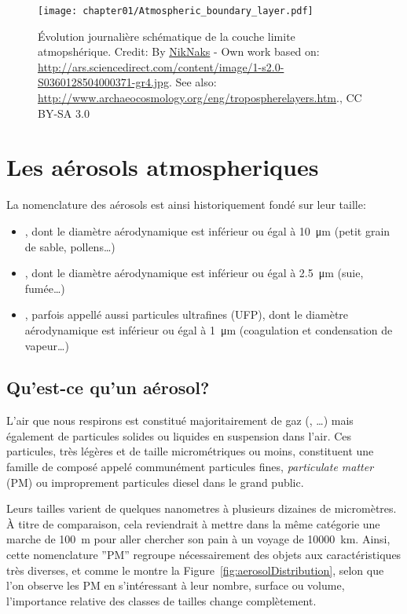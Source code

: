 \begin{figure}[h]
    \centering
    \texttt{[image: chapter01/Atmospheric\_boundary\_layer.pdf]}
    \caption{Évolution journalière schématique de la couche limite atmopshérique.
        Credit: By
        \href{https://commons.wikimedia.org/w/index.php?curid=18862904}{NikNaks} - Own
        work based on:
        \url{http://ars.sciencedirect.com/content/image/1-s2.0-S0360128504000371-gr4.jpg}.
        See also: \url{http://www.archaeocosmology.org/eng/tropospherelayers.htm}., CC
        BY-SA 3.0
    }%
    \label{fig:chapter01/Atmospheric_boundary_layer}
\end{figure}


\section{Les aérosols atmospheriques}%
\label{sec:les_aerosols_atmospheriques}
La nomenclature des aérosols est ainsi historiquement fondé sur leur taille:
\begin{itemize}
    \item \PMdix, dont le diamètre aérodynamique est inférieur ou égal à \SI{10}{\um} (petit
        grain de sable, pollens…)
    \item \PMdc, dont le diamètre aérodynamique est inférieur ou égal à \SI{2.5}{\um}
        (suie, fumée…)
    \item \PMun, parfois appellé aussi particules ultrafines (UFP), dont le diamètre
        aérodynamique est inférieur ou égal à \SI{1}{\um} (coagulation et condensation de
        vapeur…)
\end{itemize}


\subsection{Qu'est-ce qu'un aérosol?}%
\label{sub:quest-ce-quun-aerosol}

L'air que nous respirons est constitué majoritairement de gaz (, …) mais
également de particules solides ou liquides en suspension dans l'air. Ces particules, très
légères et de taille micrométriques ou moins, constituent une famille de composé appelé
communément particules fines, \textit{particulate matter} (PM) ou improprement particules
diesel dans le grand public.

Leurs tailles varient de quelques nanometres à plusieurs dizaines de micromètres.
À titre de comparaison, cela reviendrait à mettre dans la même catégorie une marche de
\SI{100}{m} pour aller chercher son pain à un voyage de \SI{10000}{km}.
Ainsi, cette nomenclature ''PM'' regroupe nécessairement des objets aux caractéristiques
très diverses, et comme le montre la Figure~\ref{fig:aerosolDistribution}, selon
que l'on observe les PM en s'intéressant à leur nombre, surface ou volume, l'importance
relative des classes de tailles change complètement.

